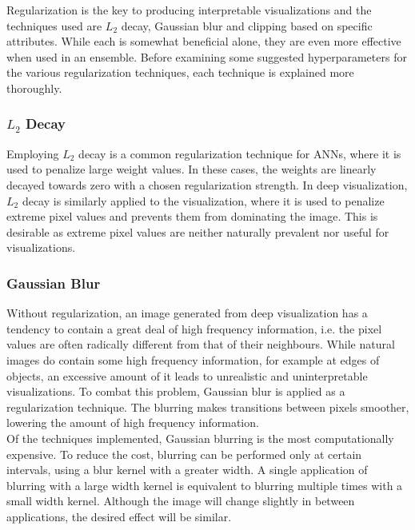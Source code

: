 \noindent Regularization is the key to producing interpretable visualizations and the techniques used are $L_2$ decay, Gaussian blur and clipping based on specific attributes. While each is somewhat beneficial alone, they are even more effective when used in an ensemble. Before examining some suggested hyperparameters for the various regularization techniques, each technique is explained more thoroughly.

\subsubsection{$L_2$ Decay}

Employing $L_2$ decay is a common regularization technique for ANNs, where it is used to penalize large weight values. In these cases, the weights are linearly decayed towards zero with a chosen regularization strength. In deep visualization, $L_2$ decay is similarly applied to the visualization, where it is used to penalize extreme pixel values and prevents them from dominating the image. This is desirable as extreme pixel values are neither naturally prevalent nor useful for visualizations.

\subsubsection{Gaussian Blur}

Without regularization, an image generated from deep visualization has a tendency to contain a great deal of high frequency information, i.e. the pixel values are often radically different from that of their neighbours. While natural images do contain some high frequency information, for example at edges of objects, an excessive amount of it leads to unrealistic and uninterpretable visualizations. To combat this problem, Gaussian blur is applied as a regularization technique. The blurring makes transitions between pixels smoother, lowering the amount of high frequency information. \\

\noindent Of the techniques implemented, Gaussian blurring is the most computationally expensive. To reduce the cost, blurring can be performed only at certain intervals, using a blur kernel with a greater width. A single application of blurring with a large width kernel is equivalent to blurring multiple times with a small width kernel. Although the image will change slightly in between applications, the desired effect will be similar. 

